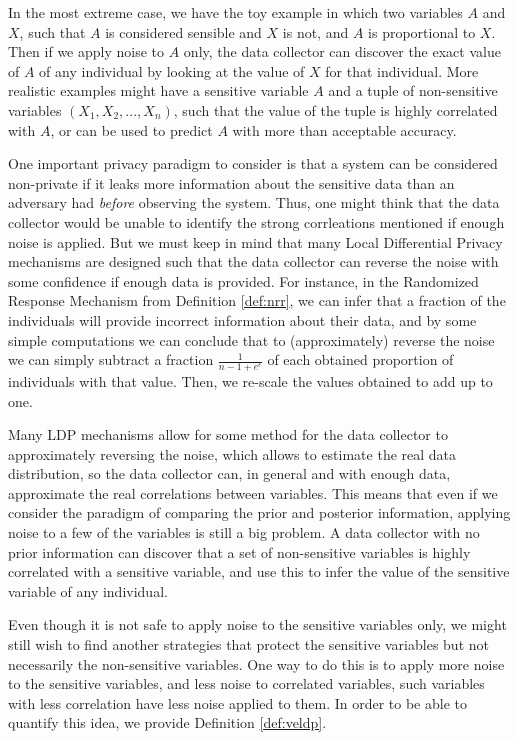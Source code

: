 \documentclass[conference]{IEEEtran}
\begin{document}
In the most extreme case, we have the toy example in which two variables $A$ and $X$, such that $A$ is considered sensible and $X$ is not, and $A$ is proportional to $X$. Then if we apply noise to $A$ only, the data collector can discover the exact value of $A$ of any individual by looking at the value of $X$ for that individual. More realistic examples might have a sensitive variable $A$ and a tuple of non-sensitive variables $(X_1,X_2,...,X_n)$, such that the value of the tuple is highly correlated with $A$, or can be used to predict $A$ with more than acceptable accuracy.

One important privacy paradigm to consider is that a system can be considered non-private if it leaks more information about the sensitive data than an adversary had \textit{before} observing the system. Thus, one might think that the data collector would be unable to identify the strong corrleations mentioned if enough noise is applied. But we must keep in mind that many Local Differential Privacy mechanisms are designed such that the data collector can reverse the noise with some confidence if enough data is provided. For instance, in the Randomized Response Mechanism from Definition \ref{def:nrr}, we can infer that a fraction of the individuals will provide incorrect information about their data, and by some simple computations we can conclude that to (approximately) reverse the noise we can simply subtract a fraction $\frac{1}{n-1+e^\epsilon}$ of each obtained proportion of individuals with that value. Then, we re-scale the values obtained to add up to one.

Many LDP mechanisms allow for some method for the data collector to approximately reversing the noise, which allows to estimate the real data distribution, so the data collector can, in general and with enough data, approximate the real correlations between variables. This means that even if we consider the paradigm of comparing the prior and posterior information, applying noise to a few of the variables is still a big problem. A data collector with no prior information can discover that a set of non-sensitive variables is highly correlated with a sensitive variable, and use this to infer the value of the sensitive variable of any individual.

Even though it is not safe to apply noise to the sensitive variables only, we might still wish to find another strategies that protect the sensitive variables but not necessarily the non-sensitive variables. One way to do this is to apply more noise to the sensitive variables, and less noise to correlated variables, such variables with less correlation have less noise applied to them. In order to be able to quantify this idea, we provide Definition \ref{def:veldp}.
\end{document}
